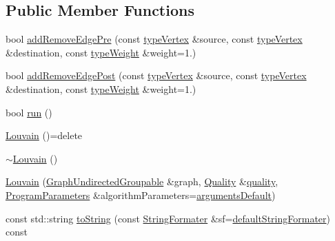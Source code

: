 \subsection*{Public Member Functions}
\begin{DoxyCompactItemize}
\item 
bool \hyperlink{classLouvain_a901a012db039c09d11c03c2f7b611b66}{add\+Remove\+Edge\+Pre} (const \hyperlink{edge_8h_a5fbd20c46956d479cb10afc9855223f6}{type\+Vertex} \&source, const \hyperlink{edge_8h_a5fbd20c46956d479cb10afc9855223f6}{type\+Vertex} \&destination, const \hyperlink{edge_8h_a2e7ea3be891ac8b52f749ec73fee6dd2}{type\+Weight} \&weight=1.)
\item 
bool \hyperlink{classLouvain_afdd2966eb7ca34f8ddbc67470d7d4771}{add\+Remove\+Edge\+Post} (const \hyperlink{edge_8h_a5fbd20c46956d479cb10afc9855223f6}{type\+Vertex} \&source, const \hyperlink{edge_8h_a5fbd20c46956d479cb10afc9855223f6}{type\+Vertex} \&destination, const \hyperlink{edge_8h_a2e7ea3be891ac8b52f749ec73fee6dd2}{type\+Weight} \&weight=1.)
\item 
bool \hyperlink{classLouvain_ad43da46797e9e0ed91dca7fefd428148}{run} ()
\item 
\hyperlink{classLouvain_a89f2b30815253babdc862aa0d8c4f892}{Louvain} ()=delete
\item 
\hyperlink{classLouvain_ab1e0249e6af438c5c3e133bf68302607}{$\sim$\+Louvain} ()
\item 
\hyperlink{classLouvain_af231d4b9a0cc645d74edffdf6e6445ff}{Louvain} (\hyperlink{classGraphUndirectedGroupable}{Graph\+Undirected\+Groupable} \&graph, \hyperlink{classQuality}{Quality} \&\hyperlink{classLouvain_ae328a55f83e485adb14a501bfb704d75}{quality}, \hyperlink{structProgramParameters}{Program\+Parameters} \&algorithm\+Parameters=\hyperlink{program_8h_ae2d819404495f80f31db7676c1329d19}{arguments\+Default})
\item 
const std\+::string \hyperlink{classLouvain_aa5c1497cdc36d829b5782f3bc9b577e6}{to\+String} (const \hyperlink{classStringFormater}{String\+Formater} \&sf=\hyperlink{stringFormater_8h_acb8730b93a9ef8ba728f69e3405b975a}{default\+String\+Formater}) const
\end{DoxyCompactItemize}
